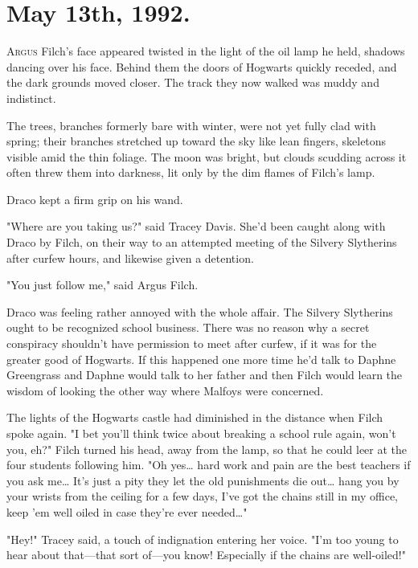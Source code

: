 
\section{May 13th, 1992.}

\lettrine{A}{rgus} Filch's face appeared twisted in the light of the oil lamp he held,
shadows dancing over his face. Behind them the doors of Hogwarts quickly
receded, and the dark grounds moved closer. The track they now walked was muddy
and indistinct.

The trees, branches formerly bare with winter, were not yet fully clad with
spring; their branches stretched up toward the sky like lean fingers, skeletons
visible amid the thin foliage. The moon was bright, but clouds scudding across
it often threw them into darkness, lit only by the dim flames of Filch's lamp.

Draco kept a firm grip on his wand.

"Where are you taking us?" said Tracey Davis. She'd been caught along with
Draco by Filch, on their way to an attempted meeting of the Silvery Slytherins
after curfew hours, and likewise given a detention.

"You just follow me," said Argus Filch.

Draco was feeling rather annoyed with the whole affair. The Silvery Slytherins
ought to be recognized school business. There was no reason why a secret
conspiracy shouldn't have permission to meet after curfew, if it was for the
greater good of Hogwarts. If this happened one more time he'd talk to Daphne
Greengrass and Daphne would talk to her father and then Filch would learn the
wisdom of looking the other way where Malfoys were concerned.

The lights of the Hogwarts castle had diminished in the distance when Filch
spoke again. "I bet you'll think twice about breaking a school rule again,
won't you, eh?" Filch turned his head, away from the lamp, so that he could
leer at the four students following him. "Oh yes{\ldots} hard work and pain are
the best teachers if you ask me{\ldots} It's just a pity they let the old
punishments die out{\ldots} hang you by your wrists from the ceiling for a few
days, I've got the chains still in my office, keep 'em well oiled in case
they're ever needed{\ldots}"

"Hey!" Tracey said, a touch of indignation entering her voice. "I'm too young
to hear about that---that sort of---you know! Especially if the chains are
well-oiled!"


